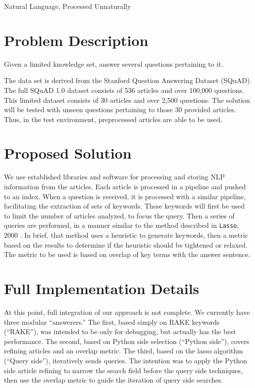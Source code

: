 \documentclass[11pt]{article}
\begin{document}
\HomeworkHeader{}{}%

\begin{center}\huge{Natural Language, Processed Unnaturally}\end{center}

\section{Problem Description}

Given a limited knowledge set, answer several questions pertaining to it.

The data set is derived from the Stanford Question Answering Dataset (SQuAD). The full SQuAD 1.0 dataset consists of 536 articles and over 100,000 questions. This limited dataset consists of 30 articles and over 2,500 questions. The solution will be tested with unseen questions pertaining to those 30 provided articles. Thus, in the test environment, preprocessed articles are able to be used.

\section{Proposed Solution}

We use established libraries and software for processing and storing NLP information from the articles. Each article is processed in a pipeline and pushed to an index. When a question is received, it is processed with a similar pipeline, facilitating the extraction of sets of keywords. These keywords will first be used to limit the number of articles analyzed, to focus the query. Then a series of queries are performed, in a manner similar to the method described in \texttt{Lasso}, 2000 \cite{lasso2000}. In brief, that method uses a heuristic to generate keywords, then a metric based on the results to determine if the heuristic should be tightened or relaxed. The metric to be used is based on overlap of key terms with the answer sentence.

\section{Full Implementation Details}

At this point, full integration of our approach is not complete. We currently have three modular ``answerers.'' The first, based simply on RAKE keywords (``RAKE''), was intended to be only for debugging, but actually has the best performance. The second, based on Python side selection (``Python side''), covers refining articles and an overlap metric. The third, based on the lasso algorithm (``Query side''), iteratively sends queries. The intention was to apply the Python side article refining to narrow the search field before the query side techniques, then use the overlap metric to guide the iteration of query side searches.
\end{document}
